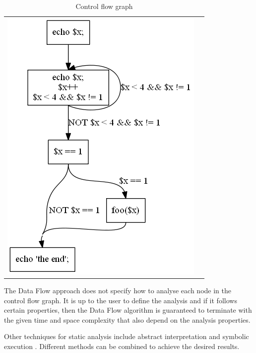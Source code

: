 \begin{table}[h]
  \begin{tabular}{ l | p{3cm} }
  \centering
    \includegraphics[scale=0.7]{cfg.png}
  &
 
 
\begin{minipage}{1in} 
\vspace{0pt}
%
%    
\end{minipage}

  \\
  \end{tabular}
  \caption{Control flow graph\label{cfg}}  
\end{table}

The Data Flow approach does not specify how to analyse each node 
in the control flow graph. It is up to the user to define 
the analysis and if it follows certain properties, then the 
Data Flow algorithm is guaranteed to terminate with the given 
time and space complexity that also depend on the analysis properties.

Other techniques for static analysis include 
abstract interpretation \cite{cousot1977abstract} 
and symbolic execution \cite{king1976symbolic}. 
Different methods can be combined to achieve 
the desired results. 


